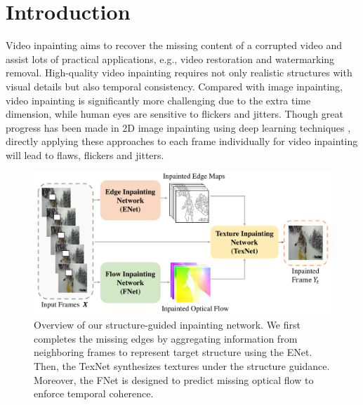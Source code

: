 

\section{Introduction}


Video inpainting aims to recover the missing content of a corrupted video and assist lots of practical applications, e.g., video restoration and watermarking removal. 
High-quality video inpainting requires not only realistic structures with visual details but also temporal consistency. 
Compared with image inpainting, video inpainting is significantly more challenging due to the extra time dimension, while human eyes are sensitive to flickers and jitters.
% 
Though great progress has been made in 2D image inpainting using deep learning techniques \cite{yu2018free,Xiong_2019_CVPR}, directly applying these approaches to each frame individually for video inpainting will lead to flaws, flickers and jitters. 

\begin{figure}[t]
	\centering
	\includegraphics[width=1.0\columnwidth]{zong} %
	\caption{Overview of our structure-guided inpainting network. We first completes the missing edges by aggregating information from neighboring frames to represent target structure using the ENet. Then, the TexNet synthesizes textures under the structure guidance. Moreover, the FNet is designed to predict missing optical flow to enforce temporal coherence.}
	\label{zong}
\end{figure}


